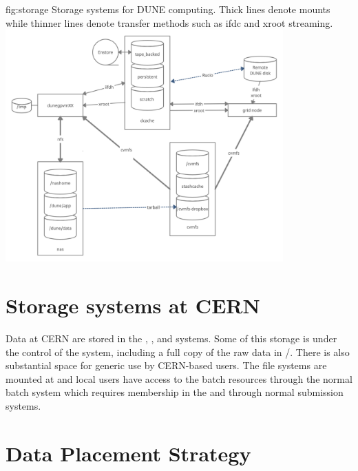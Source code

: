 \documentclass[../main-v1.tex]{subfiles}
\begin{document}
\begin{dunefigure}
{fig:storage}
{Storage systems for DUNE computing.  Thick lines denote mounts while thinner lines denote transfer methods such as ifdc and xroot streaming.}
\includegraphics[width=0.8\textwidth]{graphics/DataManagement/StorageMap2.png}
\end{dunefigure}

\section{Storage systems at CERN}

Data at CERN are stored in the , , and  systems.  Some of this storage is under the control of the  
system, including a full copy of the  raw data in /.  There is also substantial space for generic use by CERN-based users. The  file systems are mounted at  and local users have access to the  batch resources through the normal  batch system which requires membership in the   and through normal  submission systems.  

\section{Data Placement Strategy}

\end{document}
